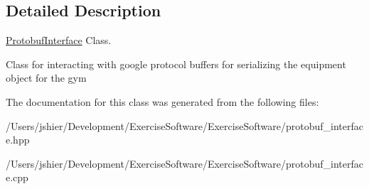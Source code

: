 \subsection{Detailed Description}
\hyperlink{class_protobuf_interface}{Protobuf\+Interface} Class. 

Class for interacting with google protocol buffers for serializing the equipment object for the gym 

The documentation for this class was generated from the following files\+:\begin{DoxyCompactItemize}
\item 
/\+Users/jshier/\+Development/\+Exercise\+Software/\+Exercise\+Software/protobuf\+\_\+interface.\+hpp\item 
/\+Users/jshier/\+Development/\+Exercise\+Software/\+Exercise\+Software/protobuf\+\_\+interface.\+cpp\end{DoxyCompactItemize}
